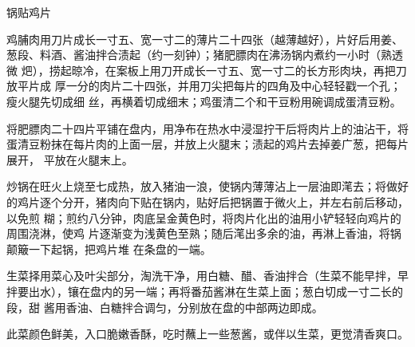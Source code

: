 \begin{recipe}{锅贴鸡片}

\ingredients


\preparation

\step 鸡脯肉用刀片成长一寸五、宽一寸二的薄片二十四张（越薄越好），片好后用姜、
葱段、料酒、酱油拌合渍起（约一刻钟）；猪肥膘肉在沸汤锅内煮约一小时（熟透微
𤆵），捞起晾冷，在案板上用刀开成长一寸五、宽一寸二的长方形肉块，再把刀放平片成
厚一分的肉片二十四张，并用刀尖把每片的四角及中心轻轻戳一个孔；瘦火腿先切成细
丝，再横着切成细末；鸡蛋清二个和干豆粉用碗调成蛋清豆粉。

\step 将肥膘肉二十四片平铺在盘内，用净布在热水中浸湿拧干后将肉片上的油沾干，将
蛋清豆粉抹在每片肉的上面一层，并放上火腿末；渍起的鸡片去掉姜广葱，把每片展开，
平放在火腿末上。

\step 炒锅在旺火上烧至七成热，放入猪油一浪，使锅内薄薄沾上一层油即滗去；将做好
的鸡片逐个分开，猪肉向下贴在锅内，贴好后把锅置于微火上，并左右前后移动，以免煎
糊；煎约八分钟，肉底呈金黄色时，将肉片化出的油用小铲轻轻向鸡片的周围浇淋，使鸡
片逐渐变为浅黄色至熟；随后滗出多余的油，再淋上香油，将锅颠簸一下起锅，把鸡片堆
在条盘的一端。

\step 生菜择用菜心及叶尖部分，淘洗干净，用白糖、醋、香油拌合（生菜不能早拌，早
拌要出水），镶在盘内的另一端；再将番茄酱淋在生菜上面；葱白切成一寸二长的段，甜
酱用香油、白糖拌合调匀，分别放在盘的中部两边即成。

\features

此菜颜色鲜美，入口脆嫩香酥，吃时蘸上一些葱酱，或伴以生菜，更觉清香爽口。

\end{recipe}

